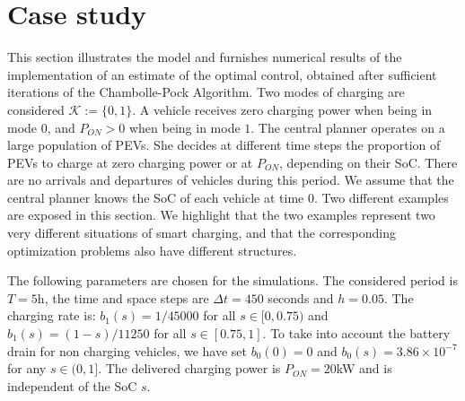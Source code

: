 \documentclass[conference]{IEEEtran}
\def\K{\mathcal{K}}
\begin{document}
\section{Case study}\label{case_study_pres}
This section illustrates the model and furnishes numerical results of the implementation of an estimate of the optimal control, obtained after sufficient iterations of the Chambolle-Pock Algorithm. 
Two modes of charging are considered $\K:=\{0,1\}$. A vehicle receives zero charging power when being in mode $0$, and $P_{ON}>0$ when being in mode $1$. The central planner operates on a large population of PEVs. She decides at different time steps the proportion of PEVs to charge at zero charging power or at $P_{ON}$, depending on their SoC. There are no arrivals and departures of vehicles during this period. We assume that the central planner knows the SoC of each vehicle at time $0$.
Two different examples are exposed in this section. We highlight that the two examples represent two very different situations of smart charging, and that the corresponding optimization problems also have different structures.

The following parameters are chosen for the simulations.
The considered period is $T=5$h, the time and space steps are $\Delta t = 450$ seconds and $h = 0.05$. The charging rate is: $b_1(s)=1/45000$ for all $ s\in [0,0.75)$ and $b_1(s)=(1-s)/11250$ for all $s\in [0.75,1]$.
To take into account the battery drain for non charging vehicles, we have set $b_0(0)=0$ and $b_0(s)= 3.86\times 10^{-7} $ for any $s\in (0,1]$.
The delivered charging power is $P_{ON}=20$kW and is independent of the SoC $s$.
\end{document}
